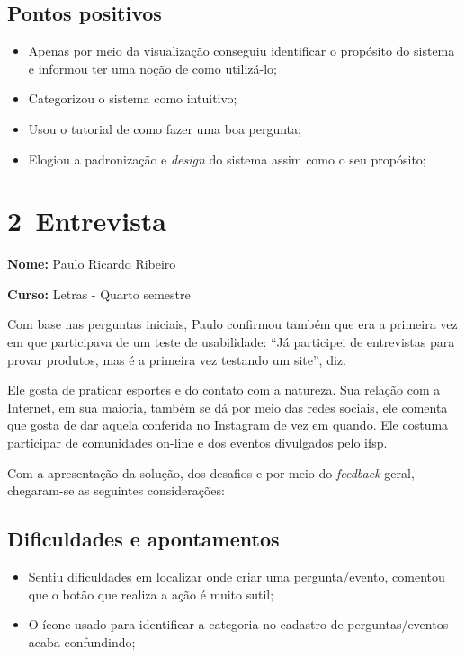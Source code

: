 \subsection{Pontos positivos}
\begin{itemize}
    \item Apenas por meio da visualização conseguiu identificar o propósito do sistema e informou ter uma noção de como utilizá-lo;
    \item Categorizou o sistema como intuitivo;
    \item Usou o tutorial de como fazer uma boa pergunta;
    \item Elogiou a padronização e \textit{design} do sistema assim como o seu propósito;
\end{itemize}

\section{2\textordfeminine \, Entrevista}

\textbf{Nome:} Paulo Ricardo Ribeiro

\textbf{Curso:} Letras - Quarto semestre

Com base nas perguntas iniciais, Paulo confirmou também que era a primeira vez em que participava de um teste de usabilidade: ``Já participei de entrevistas para provar produtos, mas é a primeira vez testando um site'', diz. 

Ele gosta de praticar esportes e do contato com a natureza. Sua relação com a Internet, em sua maioria, também se dá por meio das redes sociais, ele comenta que gosta de dar aquela conferida no Instagram de vez em quando. Ele costuma participar de comunidades on-line e dos eventos divulgados pelo \acs{ifsp}. 

Com a apresentação da solução, dos desafios e por meio do \textit{feedback} geral, chegaram-se as seguintes considerações:

\subsection{Dificuldades e apontamentos}
\begin{itemize}
    \item Sentiu dificuldades em localizar onde criar uma pergunta/evento, comentou que o botão que realiza a ação é muito sutil; 
    \item O ícone usado para identificar a categoria no cadastro de perguntas/eventos acaba confundindo;  
\end{itemize}

